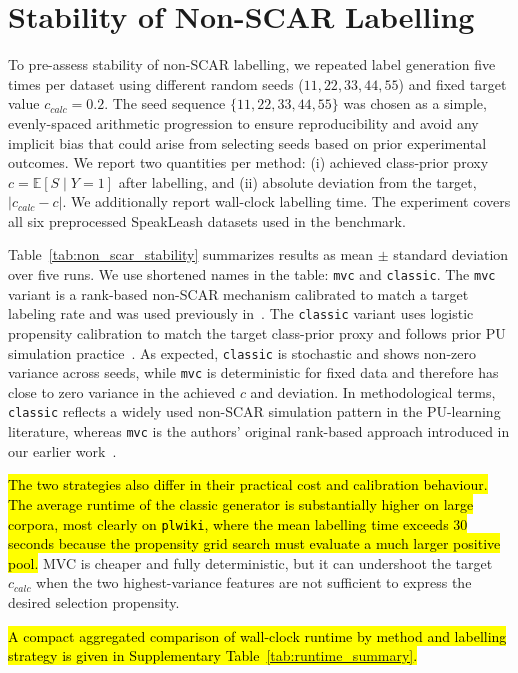 \documentclass[applsci,article,submit,pdftex,moreauthors]{Definitions/mdpi}
\newcommand{\rev}[1]{\hl{#1}}
\begin{document}
\section{Stability of Non-SCAR Labelling}
To pre-assess stability of non-SCAR labelling, we repeated label generation five times per dataset using different random seeds ($11,22,33,44,55$) and fixed target value $c_{calc}=0.2$. The seed sequence $\{11, 22, 33, 44, 55\}$ was chosen as a simple, evenly-spaced arithmetic progression to ensure reproducibility and avoid any implicit bias that could arise from selecting seeds based on prior experimental outcomes. We report two quantities per method: (i) achieved class-prior proxy $c=\mathbb{E}[S\mid Y=1]$ after labelling, and (ii) absolute deviation from the target, $|c_{calc}-c|$. We additionally report wall-clock labelling time. The experiment covers all six preprocessed SpeakLeash datasets used in the benchmark.

Table~\ref{tab:non_scar_stability} summarizes results as mean $\pm$ standard deviation over five runs. We use shortened names in the table: \texttt{mvc} and \texttt{classic}. The \texttt{mvc} variant is a rank-based non-SCAR mechanism calibrated to match a target labeling rate and was used previously in~\cite{mdai25_mvc}. The \texttt{classic} variant uses logistic propensity calibration to match the target class-prior proxy and follows prior PU simulation practice~\cite{pu_classic_propensity}. As expected, \texttt{classic} is stochastic and shows non-zero variance across seeds, while \texttt{mvc} is deterministic for fixed data and therefore has close to zero variance in the achieved $c$ and deviation. In methodological terms, \texttt{classic} reflects a widely used non-SCAR simulation pattern in the PU-learning literature, whereas \texttt{mvc} is the authors' original rank-based approach introduced in our earlier work~\cite{mdai25_mvc}.

\rev{The two strategies also differ in their practical cost and calibration behaviour.} \rev{The average runtime of the classic generator is substantially higher on large corpora, most clearly on \texttt{plwiki}, where the mean labelling time exceeds 30 seconds because the propensity grid search must evaluate a much larger positive pool.} MVC is cheaper and fully deterministic, but it can undershoot the target $c_{calc}$ when the two highest-variance features are not sufficient to express the desired selection propensity.

\rev{A compact aggregated comparison of wall-clock runtime by method and labelling strategy is given in Supplementary Table~\ref{tab:runtime_summary}.}
\end{document}
